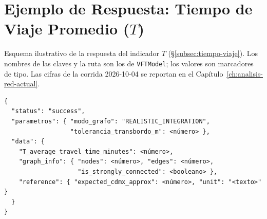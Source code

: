
\section{Ejemplo de Respuesta: Tiempo de Viaje Promedio \texorpdfstring{($T$)}{(T)}}
\label{anx:vft-out-tiempo}

Esquema ilustrativo de la respuesta del indicador $T$
(§\ref{subsec:tiempo-viaje}). Los nombres de las claves y la ruta son los
de \texttt{VFTModel}; los valores son marcadores de tipo. Las cifras de la
corrida 2026-10-04 se reportan en el Capítulo~\ref{ch:analisis-red-actual}.

\begin{lstlisting}[style=estiloPython,
  caption={Esquema de respuesta del endpoint
           \texttt{/topological/average-travel-time} (ilustrativo).},
  label=lst:out-tiempo]
{
  "status": "success",
  "parametros": { "modo_grafo": "REALISTIC_INTEGRATION",
                  "tolerancia_transbordo_m": <número> },
  "data": {
    "T_average_travel_time_minutes": <número>,
    "graph_info": { "nodes": <número>, "edges": <número>,
                    "is_strongly_connected": <booleano> },
    "reference": { "expected_cdmx_approx": <número>, "unit": "<texto>" }
  }
}
\end{lstlisting}
